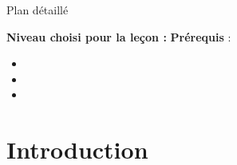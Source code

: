 \begin{reportBlock}{Plan détaillé}

  \textbf{Niveau choisi pour la leçon :} 
  \newline
  \textbf{Prérequis} : \begin{itemize}
      \item 
      \item 
      \item 
  \end{itemize}
  
  \section*{Introduction}

  \section{}

  \subsection{}   

  \section{}

  \subsection{}
  
  \section{}
  


\end{reportBlock}